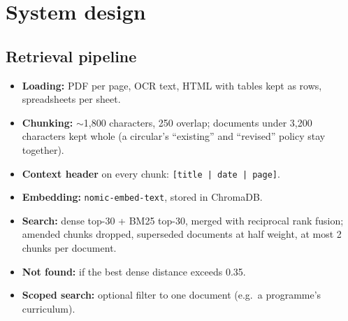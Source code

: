 \documentclass[10pt,a4paper]{article}
\newcommand{\code}[1]{\texttt{\small #1}}
\begin{document}
\section{System design}
\subsection{Retrieval pipeline}
\begin{itemize}
\item \textbf{Loading:} PDF per page, OCR text, HTML with tables kept as rows, spreadsheets per sheet.
\item \textbf{Chunking:} $\sim$1{,}800 characters, 250 overlap; documents under 3{,}200 characters kept whole
  (a circular's ``existing'' and ``revised'' policy stay together).
\item \textbf{Context header} on every chunk: \code{[title | date | page]}.
\item \textbf{Embedding:} \code{nomic-embed-text}, stored in ChromaDB.
\item \textbf{Search:} dense top-30 + BM25 top-30, merged with reciprocal rank fusion; amended chunks dropped,
  superseded documents at half weight, at most 2 chunks per document.
\item \textbf{Not found:} if the best dense distance exceeds 0.35.
\item \textbf{Scoped search:} optional filter to one document (e.g.\ a programme's curriculum).
\end{itemize}
\end{document}
